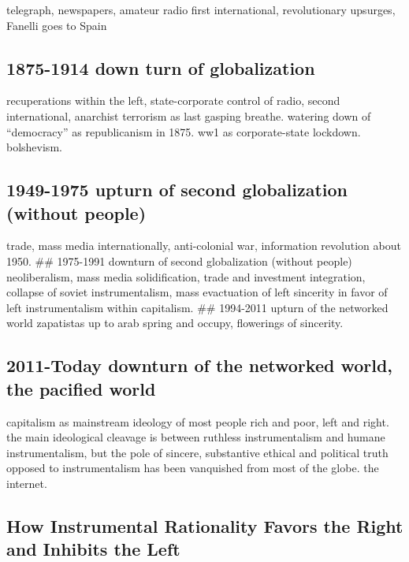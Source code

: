 \documentclass[12pt,book]{article}
\begin{document}
telegraph, newspapers, amateur radio first international, revolutionary
upsurges, Fanelli goes to Spain

\subsection{1875-1914 down turn of
globalization}\label{down-turn-of-globalization}

recuperations within the left, state-corporate control of radio, second
international, anarchist terrorism as last gasping breathe. watering
down of ``democracy'' as republicanism in 1875. ww1 as corporate-state
lockdown. bolshevism.

\subsection{1949-1975 upturn of second globalization (without
people)}\label{upturn-of-second-globalization-without-people}

trade, mass media internationally, anti-colonial war, information
revolution about 1950. \#\# 1975-1991 downturn of second globalization
(without people) neoliberalism, mass media solidification, trade and
investment integration, collapse of soviet instrumentalism, mass
evactuation of left sincerity in favor of left instrumentalism within
capitalism. \#\# 1994-2011 upturn of the networked world zapatistas up
to arab spring and occupy, flowerings of sincerity.

\subsection{2011-Today downturn of the networked world, the pacified
world}\label{today-downturn-of-the-networked-world-the-pacified-world}

capitalism as mainstream ideology of most people rich and poor, left and
right. the main ideological cleavage is between ruthless instrumentalism
and humane instrumentalism, but the pole of sincere, substantive ethical
and political truth opposed to instrumentalism has been vanquished from
most of the globe. the internet.

\subsection{How Instrumental Rationality Favors the Right and Inhibits
the
Left}\label{how-instrumental-rationality-favors-the-right-and-inhibits-the-left}
\end{document}
